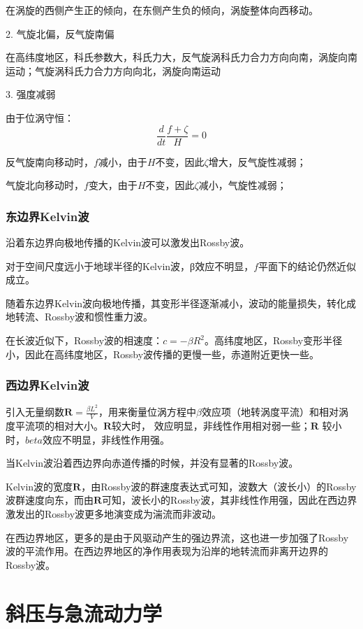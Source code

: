 \documentclass{article}
\begin{document}
在涡旋的西侧产生正的倾向，在东侧产生负的倾向，涡旋整体向西移动。

2. 气旋北偏，反气旋南偏 

在高纬度地区，科氏参数大，科氏力大，反气旋涡科氏力合力方向向南，涡旋向南运动；气旋涡科氏力合力方向向北，涡旋向南运动

3. 强度减弱

由于位涡守恒：
$$\frac{d}{dt}\frac{f+\zeta}{H}=0$$

反气旋南向移动时，$f$减小，由于$H$不变，因此$\zeta$增大，反气旋性减弱；

气旋北向移动时，$f$变大，由于$H$不变，因此$\zeta$减小，气旋性减弱；

\subsubsection{东边界Kelvin波}
沿着东边界向极地传播的Kelvin波可以激发出Rossby波。

对于空间尺度远小于地球半径的Kelvin波，β效应不明显，$f$平面下的结论仍然近似成立。

随着东边界Kelvin波向极地传播，其变形半径逐渐减小，波动的能量损失，转化成地转流、Rossby波和惯性重力波。

在长波近似下，Rossby波的相速度：$c=-\beta R^2$。高纬度地区，Rossby变形半径小，因此在高纬度地区，Rossby波传播的更慢一些，赤道附近更快一些。

\subsubsection{西边界Kelvin波}
引入无量纲数$\mathbf{R}=\frac{\beta L^2}{V}$，用来衡量位涡方程中$\beta$效应项（地转涡度平流）和相对涡度平流项的相对大小。$\mathbf{R}$较大时， 效应明显，非线性作用相对弱一些；$\mathbf{R}$ 较小时，$beta$效应不明显，非线性作用强。

当Kelvin波沿着西边界向赤道传播的时候，并没有显著的Rossby波。

Kelvin波的宽度$\mathbf{R}$，由Rossby波的群速度表达式可知，波数大（波长小）的Rossby波群速度向东，而由$\mathbf{R}$可知，波长小的Rossby波，其非线性作用强，因此在西边界激发出的Rossby波更多地演变成为湍流而非波动。

在西边界地区，更多的是由于风驱动产生的强边界流，这也进一步加强了Rossby波的平流作用。在西边界地区的净作用表现为沿岸的地转流而非离开边界的Rossby波。

\section{斜压与急流动力学}
\end{document}
